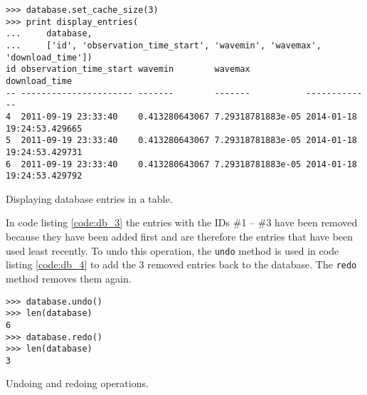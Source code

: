 \begin{listing}
\begin{verbatim}
>>> database.set_cache_size(3)
>>> print display_entries(
...     database,
...     ['id', 'observation_time_start', 'wavemin', 'wavemax', 'download_time'])
id observation_time_start wavemin        wavemax           download_time             
-- ---------------------- -------        -------           -------------             
4  2011-09-19 23:33:40    0.413280643067 7.29318781883e-05 2014-01-18 19:24:53.429665
5  2011-09-19 23:33:40    0.413280643067 7.29318781883e-05 2014-01-18 19:24:53.429731
6  2011-09-19 23:33:40    0.413280643067 7.29318781883e-05 2014-01-18 19:24:53.429792
\end{verbatim}
\caption{Displaying database entries in a table.}
\label{code:db_3}
\end{listing}

In code listing \ref{code:db_3} the entries with the IDs \#1 -- \#3 have been
removed because they have been added first and are therefore the entries that
have been used least recently. To undo this operation, the \texttt{undo} method
is used in code listing \ref{code:db_4} to add the 3 removed entries back to
the database. The \texttt{redo} method removes them again.

\begin{listing}
\begin{verbatim}
>>> database.undo()
>>> len(database)
6
>>> database.redo()
>>> len(database)
3
\end{verbatim}
\caption{Undoing and redoing operations.}
\label{code:db_4}
\end{listing}

